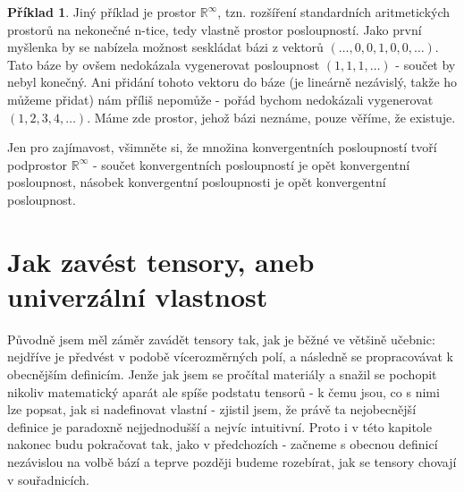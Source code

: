 \documentclass[a5paper,12pt]{amsbook}
\theoremstyle{definition}
\newtheorem{example}{Příklad}[chapter]
\begin{document}
\begin{example}
Jiný příklad je prostor $\mathbb{R}^\infty$, tzn. rozšíření standardních aritmetických prostorů
na nekonečné n-tice, tedy vlastně prostor posloupností. Jako první myšlenka by se nabízela možnost
seskládat bázi z vektorů $(\hdots, 0, 0, 1, 0, 0, \hdots)$. Tato báze by ovšem nedokázala
vygenerovat posloupnost $(1, 1, 1, \hdots)$ - součet by nebyl konečný. Ani přidání tohoto
vektoru do báze (je lineárně nezávislý, takže ho můžeme přidat) nám příliš nepomůže - pořád
bychom nedokázali vygenerovat $(1, 2, 3, 4, \hdots)$. Máme zde prostor, jehož bázi neznáme,
pouze věříme, že existuje.

Jen pro zajímavost, všimněte si, že množina konvergentních posloupností tvoří podprostor
$\mathbb{R}^\infty$ - součet konvergentních posloupností je opět konvergentní posloupnost,
násobek konvergentní posloupnosti je opět konvergentní posloupnost.
\end{example}

\section{Jak zavést tensory, aneb univerzální vlastnost}

\noindent
Původně jsem měl záměr zavádět tensory tak, jak je běžné ve většině učebnic: nejdříve je předvést
v podobě vícerozměrných polí, a následně se propracovávat k obecnějším definicím. Jenže jak jsem se
pročítal materiály a snažil se pochopit nikoliv matematický aparát ale spíše podstatu tensorů - k čemu
jsou, co s nimi lze popsat, jak si nadefinovat vlastní - zjistil jsem, že právě ta nejobecnější definice
je paradoxně nejjednodušší a nejvíc intuitivní. Proto i v této kapitole nakonec budu pokračovat
tak, jako v předchozích - začneme s obecnou definicí nezávislou na volbě bází a teprve později budeme
rozebírat, jak se tensory chovají v souřadnicích.
\end{document}
